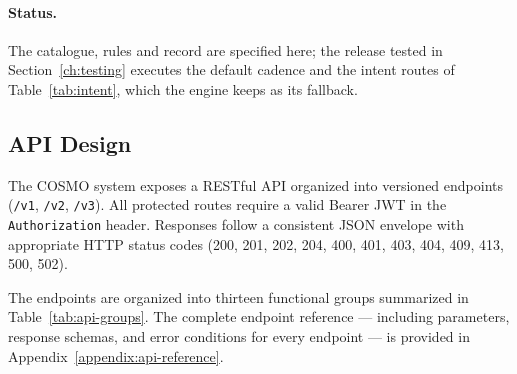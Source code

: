 \documentclass[a4paper]{article}
\begin{document}
\paragraph{Status.} The catalogue, rules and record are specified here; the
release tested in Section~\ref{ch:testing} executes the default cadence and
the intent routes of Table~\ref{tab:intent}, which the engine keeps as its
fallback.

\subsection{API Design}

The COSMO system exposes a RESTful API organized into versioned
endpoints (\texttt{/v1}, \texttt{/v2}, \texttt{/v3}). All protected
routes require a valid Bearer JWT in the \texttt{Authorization}
header. Responses follow a consistent JSON envelope with appropriate
HTTP status codes (200, 201, 202, 204, 400, 401, 403, 404, 409,
413, 500, 502).

The endpoints are organized into thirteen functional groups
summarized in Table~\ref{tab:api-groups}. The complete endpoint reference --- including
parameters, response schemas, and error conditions for every
endpoint --- is provided in Appendix~\ref{appendix:api-reference}.
\end{document}
